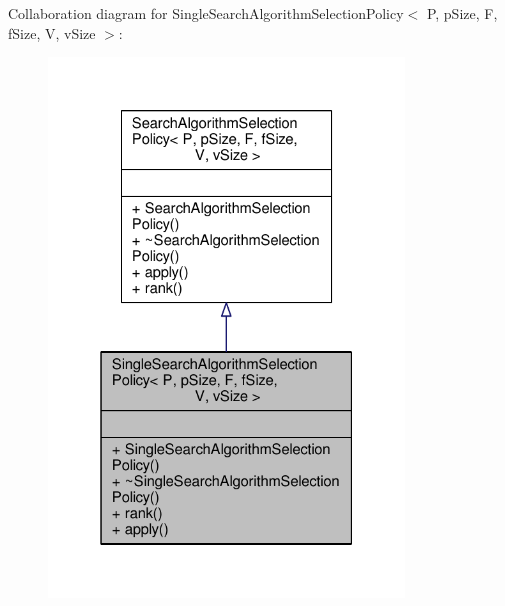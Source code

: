 Collaboration diagram for Single\+Search\+Algorithm\+Selection\+Policy$<$ P, p\+Size, F, f\+Size, V, v\+Size $>$\+:\nopagebreak
\begin{figure}[H]
\begin{center}
\leavevmode
\includegraphics[width=268pt]{classSingleSearchAlgorithmSelectionPolicy__coll__graph}
\end{center}
\end{figure}
